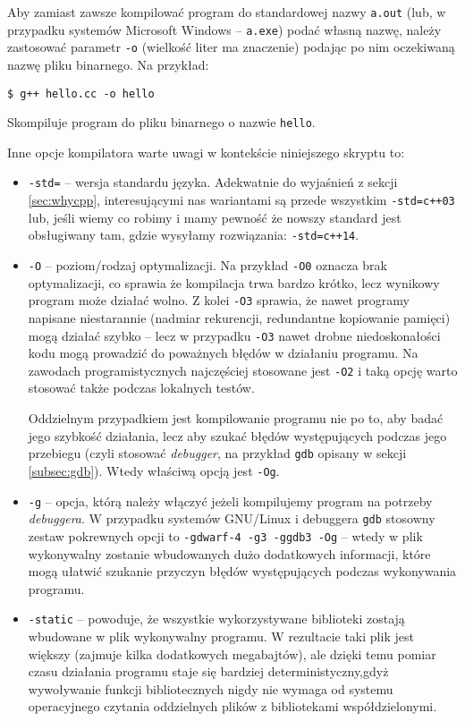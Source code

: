 Aby zamiast zawsze kompilować program do standardowej nazwy \texttt{a.out} (lub,
w przypadku systemów Microsoft Windows -- \texttt{a.exe}) podać własną nazwę,
należy zastosować parametr \texttt{-o} (wielkość liter ma znaczenie) podając
po nim oczekiwaną nazwę pliku binarnego. Na przykład:
\begin{Verbatim}[fontsize=\footnotesize]
$ g++ hello.cc -o hello
\end{Verbatim}

Skompiluje program do pliku binarnego o nazwie \texttt{hello}.

Inne opcje kompilatora warte uwagi w kontekście niniejszego skryptu to:
\begin{itemize}
\item \texttt{-std=} -- wersja standardu języka. Adekwatnie do wyjaśnień
z sekcji \ref{sec:whycpp}, interesującymi nas wariantami są przede wszystkim
\texttt{-std=c++03} lub, jeśli wiemy co robimy i mamy pewność że nowszy standard
jest obsługiwany tam, gdzie wysyłamy rozwiązania: \texttt{-std=c++14}.

\item \texttt{-O} -- poziom/rodzaj optymalizacji. Na przykład \texttt{-O0}
oznacza brak optymalizacji, co sprawia że kompilacja trwa bardzo krótko,
lecz wynikowy program może działać wolno. Z kolei \texttt{-O3} sprawia, że nawet
programy napisane niestarannie (nadmiar rekurencji, redundantne kopiowanie
pamięci) mogą działać szybko -- lecz w przypadku \texttt{-O3} nawet drobne
niedoskonałości kodu mogą prowadzić do poważnych błędów w działaniu programu.
Na zawodach programistycznych najczęściej stosowane jest \texttt{-O2} i taką
opcję warto stosować także podczas lokalnych testów.

Oddzielnym przypadkiem jest kompilowanie programu nie po to, aby badać jego
szybkość działania, lecz aby szukać błędów występujących podczas jego przebiegu
(czyli stosować \emph{debugger}, na przykład \texttt{gdb} opisany w sekcji
\ref{subsec:gdb}). Wtedy właściwą opcją jest \texttt{-Og}.

\item \texttt{-g} -- opcja, którą należy włączyć jeżeli kompilujemy program na
potrzeby \emph{debuggera}. W przypadku systemów GNU/Linux i debuggera
\texttt{gdb} stosowny zestaw pokrewnych opcji to
\texttt{-gdwarf-4 -g3 -ggdb3 -Og} -- wtedy w plik wykonywalny zostanie
wbudowanych dużo dodatkowych informacji, które mogą ułatwić szukanie przyczyn
błędów występujących podczas wykonywania programu.

\item \texttt{-static} -- powoduje, że wszystkie wykorzystywane biblioteki
zostają wbudowane w plik wykonywalny programu. W rezultacie taki plik jest
większy (zajmuje kilka dodatkowych megabajtów), ale dzięki temu pomiar czasu
działania programu staje się bardziej deterministyczny,gdyż wywoływanie funkcji
bibliotecznych nigdy nie wymaga od systemu operacyjnego czytania oddzielnych
plików z bibliotekami współdzielonymi.


\end{itemize}
